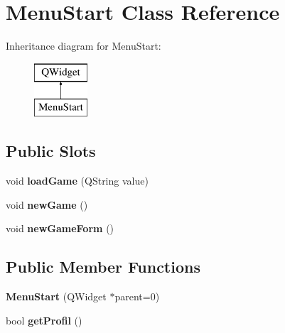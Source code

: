 \hypertarget{class_menu_start}{}\section{Menu\+Start Class Reference}
\label{class_menu_start}
Inheritance diagram for Menu\+Start\+:\begin{figure}[H]
\begin{center}
\leavevmode
\includegraphics[height=2.000000cm]{class_menu_start}
\end{center}
\end{figure}
\subsection*{Public Slots}
\begin{DoxyCompactItemize}
\item 
\hypertarget{class_menu_start_a8af8ec946e4b575852937b469bfe3d59}{}void {\bfseries load\+Game} (Q\+String value)\label{class_menu_start_a8af8ec946e4b575852937b469bfe3d59}

\item 
\hypertarget{class_menu_start_a3ebce084546f1f9374a2e1cd0378d17a}{}void {\bfseries new\+Game} ()\label{class_menu_start_a3ebce084546f1f9374a2e1cd0378d17a}

\item 
\hypertarget{class_menu_start_a27892e476830d761fae92cc8b7db323f}{}void {\bfseries new\+Game\+Form} ()\label{class_menu_start_a27892e476830d761fae92cc8b7db323f}

\end{DoxyCompactItemize}
\subsection*{Public Member Functions}
\begin{DoxyCompactItemize}
\item 
\hypertarget{class_menu_start_a184ff65bb2534378670fee22487b02eb}{}{\bfseries Menu\+Start} (Q\+Widget $\ast$parent=0)\label{class_menu_start_a184ff65bb2534378670fee22487b02eb}

\item 
\hypertarget{class_menu_start_aa472610f5ba9e271cb02159d2ca421cc}{}bool {\bfseries get\+Profil} ()\label{class_menu_start_aa472610f5ba9e271cb02159d2ca421cc}

\end{DoxyCompactItemize}
